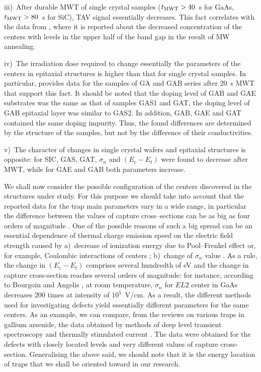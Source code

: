 \documentclass[10pt]{iopart}
\begin{document}
\noindent
iii)~After durable MWT of single crystal samples ($t_{\rm MWT}>40$~s for GaAs,  $t_{\rm MWT}>80$~s for SiC),
TAV signal essentially decreases.
This fact correlates with the data  from \cite{Belyaev1998JTFEn},
where it is reported about  the decreased concentration of the centers with levels in the upper half of the band gap in the result of MW annealing.

\noindent
iv)~The irradiation dose required to change essentially the parameters of the centers in epitaxial structures is higher than that for single crystal samples.
In particular,  provides  data for the samples of GA and GAB series after 20~s MWT
that support this fact.
It should be noted that the doping level of  GAB and GAE substrates was the same as that of samples GAS1 and GAT,
the doping level of GAB epitaxial layer was similar to GAS2.
In addition, GAB, GAE and GAT contained the same doping impurity.
Thus, the found differences are determined by the structure of the samples, but not by the difference of their conductivities.

\noindent
v)~The character of changes in single crystal wafers and epitaxial structures is opposite:
for SIC, GAS, GAT, $\sigma_n$ and $(E_c-E_t)$ were found to decrease after MWT,
while for GAE and GAB both parameters increase.


We shall now consider the possible configuration of the centers discovered in the structures under study.
For this purpose we should take into account that the reported data for the trap main parameters vary in a wide range,
in particular the difference between the values of capture cross--sections can be as big as four orders of magnitude \cite{Pavlovic2000}.
One of the possible reasons of such a big spread can be an essential dependence
of thermal charge emission speed on  the electric field strength \cite{Bulyarskii2000,Makram} caused by
a)~decrease of ionization energy due to Pool--Frenkel effect or, for example, Coulombic interactions of centers \cite{Stellmacher};
b)~change of $\sigma_n$  value \cite{Bourgoin2001}.
As a rule, the change in $(E_c-E_t)$ comprises several hundredth of eV and
the change in capture cross-section reaches several orders of magnitude:
for instance, according to Bourgoin and Angelis \cite{Bourgoin2001}, at room temperature,
$\sigma_n$  for $EL2$ center in GaAs decreases 200 times
at intensity of $10^5$~V/cm.
As a result, the different methods used for investigating defects yield essentially different parameters for the same centers.
As an example, we can compare, from the reviews on various traps in gallium arsenide,
the data  obtained by methods of deep level transient spectroscopy \cite{Bourgoin:GaAs}
and thermally stimulated current \cite{Pavlovic2000}.
The data were obtained for the defects with closely located levels and very different values of capture cross-section.
Generalising the above said, we should note that it is the energy location of traps that we shall be oriented toward in our research.
\end{document}
